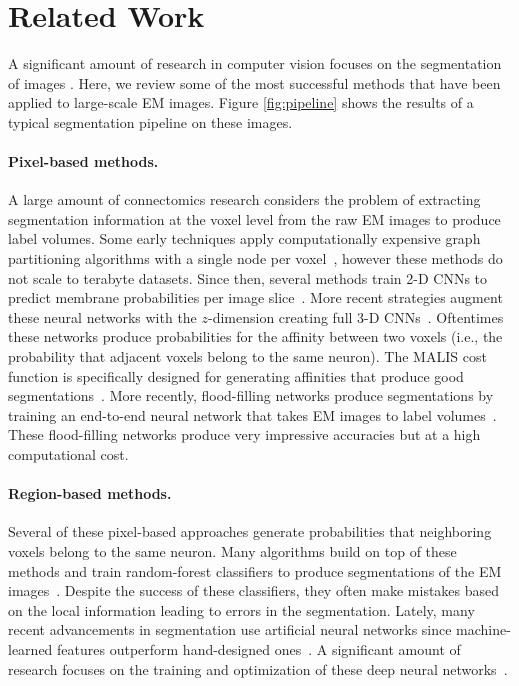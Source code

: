 \section{Related Work}

A significant amount of research in computer vision focuses on the segmentation of images \cite{zaitoun2015survey}. 
Here, we review some of the most successful methods that have been applied to large-scale EM images. Figure \ref{fig:pipeline} shows the results of a typical segmentation pipeline on these images. 

\paragraph{Pixel-based methods.} 

A large amount of connectomics research considers the problem of extracting segmentation information at the voxel level from the raw EM images to produce label volumes.
Some early techniques apply computationally expensive graph partitioning algorithms with a single node per voxel~\cite{andres2012globally}, however these methods do not scale to terabyte datasets.
Since then, several methods train 2-D CNNs to predict membrane probabilities per image slice~\cite{ciresan2012deep,jain2010boundary,kaynig2015large,seymour2016rhoananet,amelio_segmentation}. 
More recent strategies augment these neural networks with the $z$-dimension creating full 3-D CNNs~\cite{lee2015recursive,ronneberger2015u}.
Oftentimes these networks produce probabilities for the affinity between two voxels (i.e., the probability that adjacent voxels belong to the same neuron).
The MALIS cost function is specifically designed for generating affinities that produce good segmentations~\cite{briggman2009maximin}. 
More recently, flood-filling networks produce segmentations by training an end-to-end neural network that takes EM images to label volumes~\cite{januszewski2016flood}.
These flood-filling networks produce very impressive accuracies but at a high computational cost.


\paragraph{Region-based methods.} 

Several of these pixel-based approaches generate probabilities that neighboring voxels belong to the same neuron.
Many algorithms build on top of these methods and train random-forest classifiers to produce segmentations of the EM images~\cite{seymour2016rhoananet,nunez2014graph,10.1371/journal.pone.0125825,parag2017anisotropic,zlateski2015image}. 
Despite the success of these classifiers, they often make mistakes based on the local information leading to errors in the segmentation. 
Lately, many recent advancements in segmentation use artificial neural networks since machine-learned features outperform hand-designed ones~\cite{bogovic2013learned}.
A significant amount of research focuses on the training and optimization of these deep neural networks~\cite{chatfield2014return,maas2013rectifier,nesterov1983method}. 



